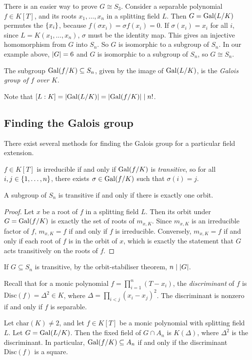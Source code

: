 There is an easier way to prove \( G \cong S_3 \).
Consider a separable polynomial \( f \in K[T] \), and its roots \( x_1, \dots, x_n \) in a splitting field \( L \).
Then \( G = \operatorname{Gal}(L / K) \) permutes the \( \qty{x_i} \), because \( f(\sigma x_i) = \sigma f(x_i) = 0 \).
If \( \sigma(x_i) = x_i \) for all \( i \), since \( L = K(x_1, \dots, x_n) \), \( \sigma \) must be the identity map.
This gives an injective homomorphism from \( G \) into \( S_n \).
So \( G \) is isomorphic to a subgroup of \( S_n \).
In our example above, \( \abs{G} = 6 \) and \( G \) is isomorphic to a subgroup of \( S_n \), so \( G \cong S_n \).
\begin{definition}
	The subgroup \( \operatorname{Gal}(f/K) \subseteq S_n \), given by the image of \( \operatorname{Gal}(L/K) \), is the \emph{Galois group of \( f \) over \( K \)}.
\end{definition}
\begin{remark}
	Note that \( [L : K] = \abs{\operatorname{Gal}(L/K)} = \abs{\operatorname{Gal}(f/K)} \mid n! \).
\end{remark}

\subsection{Finding the Galois group}
There exist several methods for finding the Galois group for a particular field extension.
\begin{proposition}
	\( f \in K[T] \) is irreducible if and only if \( \operatorname{Gal}(f/K) \) is \emph{transitive}, so for all \( i, j \in \qty{1, \dots, n} \), there exists \( \sigma \in \operatorname{Gal}(f/K) \) such that \( \sigma(i) = j \).
\end{proposition}
\begin{remark}
	A subgroup of \( S_n \) is transitive if and only if there is exactly one orbit.
\end{remark}
\begin{proof}
	Let \( x \) be a root of \( f \) in a splitting field \( L \).
	Then its orbit under \( G = \operatorname{Gal}(f/K) \) is exactly the set of roots of \( m_{x,K} \).
	Since \( m_{x,K} \) is an irreducible factor of \( f \), \( m_{x,K} = f \) if and only if \( f \) is irreducible.
	Conversely, \( m_{x,K} = f \) if and only if each root of \( f \) is in the orbit of \( x \), which is exactly the statement that \( G \) acts transitively on the roots of \( f \).
\end{proof}
\begin{remark}
	If \( G \subseteq S_n \) is transitive, by the orbit-stabiliser theorem, \( n \mid \abs{G} \).
\end{remark}
Recall that for a monic polynomial \( f = \prod_{i=1}^n (T - x_i) \), the \emph{discriminant} of \( f \) is \( \mathrm{Disc}(f) = \Delta^2 \in K \), where \( \Delta = \prod_{i < j} (x_i - x_j)^2 \).
The discriminant is nonzero if and only if \( f \) is separable.
\begin{proposition}
	Let \( \mathrm{char}(K) \neq 2 \), and let \( f \in K[T] \) be a monic polynomial with splitting field \( L \).
	Let \( G = \operatorname{Gal}(L/K) \).
	Then the fixed field of \( G \cap A_n \) is \( K(\Delta) \), where \( \Delta^2 \) is the discriminant.
	In particular, \( \operatorname{Gal}(f/K) \subseteq A_n \) if and only if the discriminant \( \mathrm{Disc}(f) \) is a square.
\end{proposition}
